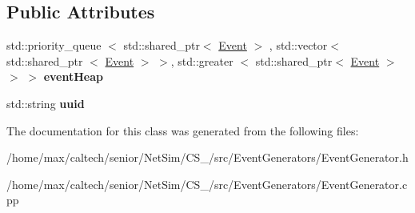 \subsection*{\-Public \-Attributes}
\begin{DoxyCompactItemize}
\item 
\hypertarget{classEventGenerator_a3e9a33f75d9861bece6c30b5249c9d39}{std\-::priority\-\_\-queue\*
$<$ std\-::shared\-\_\-ptr$<$ \hyperlink{classEvent}{\-Event} $>$\*
, std\-::vector$<$ std\-::shared\-\_\-ptr\*
$<$ \hyperlink{classEvent}{\-Event} $>$ $>$, std\-::greater\*
$<$ std\-::shared\-\_\-ptr$<$ \hyperlink{classEvent}{\-Event} $>$ $>$ $>$ {\bfseries event\-Heap}}\label{classEventGenerator_a3e9a33f75d9861bece6c30b5249c9d39}

\item 
\hypertarget{classEventGenerator_af4fa28d08ed4a3be31f9383cf72e0d2c}{std\-::string {\bfseries uuid}}\label{classEventGenerator_af4fa28d08ed4a3be31f9383cf72e0d2c}

\end{DoxyCompactItemize}


\-The documentation for this class was generated from the following files\-:\begin{DoxyCompactItemize}
\item 
/home/max/caltech/senior/\-Net\-Sim/\-C\-S\-\_/src/\-Event\-Generators/\-Event\-Generator.\-h\item 
/home/max/caltech/senior/\-Net\-Sim/\-C\-S\-\_/src/\-Event\-Generators/\-Event\-Generator.\-cpp\end{DoxyCompactItemize}
